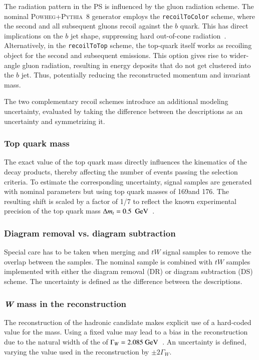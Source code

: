 The radiation pattern in the PS is influenced by the gluon radiation
scheme. The nominal \textsc{Powheg+Pythia}~8 generator employs the
\verb|recoilToColor| scheme, where the second and all subsequent
gluons recoil against the $b$ quark.
This has direct implications on the $b$ jet shape, suppressing
hard out-of-cone radiation~\cite{Brooks_2019}.
Alternatively, in the \verb|recoilToTop| scheme, the
top-quark itself works as recoiling object for the second and
subsequent emissions.
This option gives rise to wider-angle gluon radiation, resulting in energy deposits that do not get clustered into the $b$ jet.
Thus, potentially reducing the reconstructed momentum and invariant mass.

The two complementary recoil schemes introduce an additional modeling uncertainty,
evaluated by taking the difference between
the descriptions as an uncertainty and symmetrizing it.

\subsubsection{Top quark mass}

The exact value of the top quark mass directly influences the kinematics of the decay products, thereby affecting the number of events passing the selection criteria. To estimate the corresponding uncertainty, signal samples are generated with nominal parameters but using top quark masses of 169\GeV and 176\GeV. The resulting shift is scaled by a factor of 1/7
to reflect the known experimental precision of the top quark mass $\Delta m_t = 0.5~~\text{GeV}$~\cite{TOPQ-2017-03}.

\subsubsection{Diagram removal vs. diagram subtraction}

Special care has to be taken when merging \ttbar and $tW$ signal samples to
remove the overlap between the samples. 
The nominal \ttbar sample is combined with $tW$ samples implemented with
either the diagram removal (DR) or diagram subtraction (DS) scheme.
The uncertainty is defined as the difference between the descriptions.

\subsubsection{\textit{W} mass in the reconstruction}

The reconstruction of the hadronic \Whad candidate
makes explicit use of a hard-coded value for the \Wboson mass.
Using a fixed value may lead to a bias in the reconstruction due to the 
natural width of the \Wboson of $\Gamma_W = 2.085~\text{GeV}$~\cite{PDG}.
An uncertainty is defined, varying the value used in the reconstruction
by $\pm 2\Gamma_W$.

